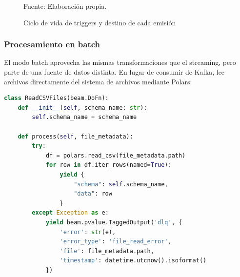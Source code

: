 \documentclass[12pt,a4paper]{article}
\renewcommand{\footnotesize}{\fontsize{10pt}{12pt}\selectfont}
\begin{document}
\begin{figure}[H]
    \centering
    \caption{Ciclo de vida de triggers y destino de cada emisión}
    {\footnotesize Fuente: Elaboración propia.}
\end{figure}

\subsubsection{Procesamiento en batch}\label{procesamiento-en-batch}

El modo batch aprovecha las mismas transformaciones que el streaming, pero parte de una fuente de datos distinta. En lugar de consumir de Kafka, lee archivos directamente del sistema de archivos mediante Polars:

\begin{lstlisting}[language=Python, caption=StorageSource -- Lectura de archivos en modo batch]
class ReadCSVFiles(beam.DoFn):
    def __init__(self, schema_name: str):
        self.schema_name = schema_name

    def process(self, file_metadata):
        try:
            df = polars.read_csv(file_metadata.path)
            for row in df.iter_rows(named=True):
                yield {
                    "schema": self.schema_name,
                    "data": row
                }
        except Exception as e:
            yield beam.pvalue.TaggedOutput('dlq', {
                'error': str(e),
                'error_type': 'file_read_error',
                'file': file_metadata.path,
                'timestamp': datetime.utcnow().isoformat()
            })
\end{lstlisting}
\end{document}
